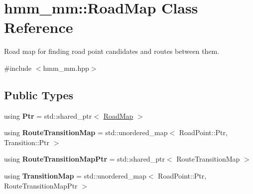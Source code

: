 \hypertarget{classhmm__mm_1_1RoadMap}{}\section{hmm\+\_\+mm\+:\+:Road\+Map Class Reference}
\label{classhmm__mm_1_1RoadMap}


Road map for finding road point candidates and routes between them.  




{\ttfamily \#include $<$hmm\+\_\+mm.\+hpp$>$}

\subsection*{Public Types}
\begin{DoxyCompactItemize}
\item 
using {\bfseries Ptr} = std\+::shared\+\_\+ptr$<$ \hyperlink{classhmm__mm_1_1RoadMap}{Road\+Map} $>$\hypertarget{classhmm__mm_1_1RoadMap_a7f4f82412272a8ec5f482d666d6f7f31}{}\label{classhmm__mm_1_1RoadMap_a7f4f82412272a8ec5f482d666d6f7f31}

\item 
using {\bfseries Route\+Transition\+Map} = std\+::unordered\+\_\+map$<$ Road\+Point\+::\+Ptr, Transition\+::\+Ptr $>$\hypertarget{classhmm__mm_1_1RoadMap_a5903f87ea4b9a454edc4eea4fed70d8a}{}\label{classhmm__mm_1_1RoadMap_a5903f87ea4b9a454edc4eea4fed70d8a}

\item 
using {\bfseries Route\+Transition\+Map\+Ptr} = std\+::shared\+\_\+ptr$<$ Route\+Transition\+Map $>$\hypertarget{classhmm__mm_1_1RoadMap_ad1816ca34b42bb77d547b82b7a4b1db3}{}\label{classhmm__mm_1_1RoadMap_ad1816ca34b42bb77d547b82b7a4b1db3}

\item 
using {\bfseries Transition\+Map} = std\+::unordered\+\_\+map$<$ Road\+Point\+::\+Ptr, Route\+Transition\+Map\+Ptr $>$\hypertarget{classhmm__mm_1_1RoadMap_a5e7ed3ff0ca50191232d9b4ab360e250}{}\label{classhmm__mm_1_1RoadMap_a5e7ed3ff0ca50191232d9b4ab360e250}

\end{DoxyCompactItemize}
